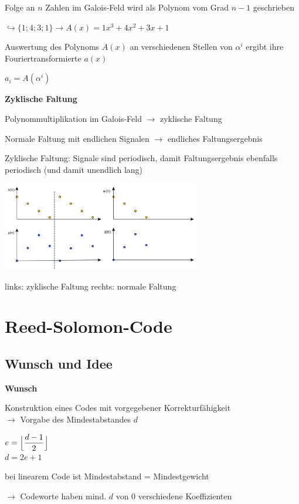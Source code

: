 Folge an $n$ Zahlen im Galois-Feld wird als Polynom vom Grad $n-1$ geschrieben

$\displaystyle{
    \hookrightarrow \{ 1; 4; 3; 1 \} \rightarrow A(x) = 1x^3 + 4x^2 + 3x + 1
}$

Auswertung des Polynoms $A(x)$ an verschiedenen Stellen von $\alpha^i$ ergibt ihre Fouriertransformierte $a(x)$

$\displaystyle{
    a_i = A(\alpha^i)
}$

\textbf{Zyklische Faltung}

Polynommultiplikation im Galois-Feld $\rightarrow$ zyklische Faltung

Normale Faltung mit endlichen Signalen $\rightarrow$ endliches Faltungsergebnis

Zyklische Faltung: Signale sind periodisch, damit Faltungsergebnis ebenfalls periodisch (und damit unendlich lang)

\includegraphics[width=8.7cm]{img/zykische_faltung.PNG}

links: zyklische Faltung \;\;\;\;\;\;\;\;\;\;\;\; rechts: normale Faltung

\section{Reed-Solomon-Code}

\subsection{Wunsch und Idee}

\textbf{Wunsch}

Konstruktion eines Codes mit vorgegebener Korrekturfähigkeit\\
$\rightarrow$ Vorgabe des Mindestabstandes $d$

$\displaystyle{
    e = \Bigl\lfloor \frac{d - 1}{2} \Bigr\rfloor
}$\\
$\displaystyle{
    d = 2e + 1
}$

bei linearem Code ist Mindestabstand = Mindestgewicht

$\rightarrow$ Codeworte haben mind. $d$ von 0 verschiedene Koeffizienten

